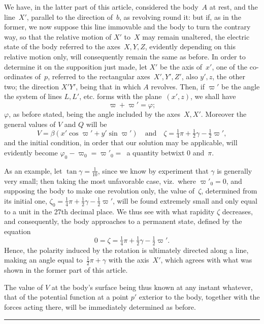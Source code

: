 \documentclass[12pt,notitlepage]{amsart}
\def\Crule{\begin{center}\rule[.5ex]{5em}{.2pt}\\[10pt]\end{center}}
\renewcommand{\phi}{\varphi}
\begin{document}
We have, in the latter part of this article, considered the body~$A$ at
rest, and the line~$X'$, parallel to the direction of~$b$,
as revolving round it:
but if, as in the former, we now suppose this line immovable and the body
to turn the contrary way, so that the relative motion of $X'$ to~$X$ may remain
unaltered, the electric state of the body referred to the axes~$X,Y,Z$, 
evidently depending on this relative motion only, will consequently remain the
same as before. In order to determine it on the supposition just made, let
$X'$ be the axis of~$x'$,
one of the co-ordinates of~$p$, referred to the rectangular
axes~$X',Y',Z'$, also $y',z$, the other two; the direction $X'Y'$, being
that in which $A$ revolves. Then, if $\varpi'$ be the angle the system of lines
$L,L'$, etc. forms with the plane~$(x',z)$, we shall have
\[
\varpi+\varpi'=\phi;
\]
$\phi$, as before stated, being the angle included by the axes~$X,X'$. Moreover
the general values of $V$ and $Q$ will be
\[
V=\beta(x'\cos\varpi'+y'\sin\varpi')
\quad\text{and}\quad
\zeta=\tfrac14\pi+\tfrac12\gamma-\tfrac12\varpi',
\]
and the initial condition, in order that our solution may be applicable, will
evidently become $\phi_0-\varpi_0=\varpi'_0=$\ a quantity betwixt $0$ and~$\pi$.

As an example, let $\tan\gamma=\frac{1}{10}$,
since we know by experiment that $\gamma$
is generally very small; then taking the most unfavorable case,
viz.\ where ${\varpi'_0=0}$,
and supposing the body to make one revolution only, the value of~$\zeta$,
determined from its initial one,
$\zeta_0=\frac14\pi+\frac12\gamma-\frac12\varpi'$,
will be found extremely
small and only equal to a unit in the 27th decimal place. We thus see with
what rapidity $\zeta$ decreases, and consequently, the body approaches to a 
permanent state, defined by the equation
\[
0=\zeta=\tfrac14\pi+\tfrac12\gamma-\tfrac12\varpi'.
\]
Hence, the polarity induced by the rotation is ultimately directed along a line,
making an angle equal to~$\frac12\pi+\gamma$
with the axis~$X'$, which agrees with what
was shown in the former part of this article.

The value of $V$ at the body's surface being thus known at any
instant whatever, that of the potential function at a point $p'$ exterior to the
body, together with the forces acting there, will be immediately determined
as before.
\Crule
\bigskip
\bigskip
\bigskip
\end{document}
